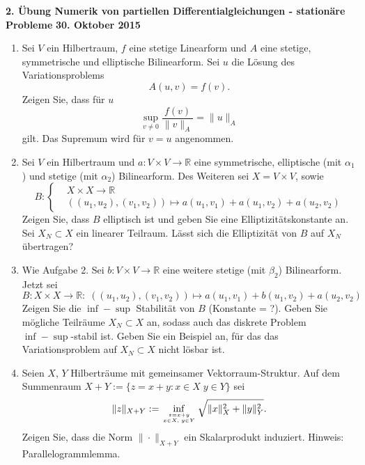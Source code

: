 \documentclass[11pt,a4paper]{report}
\begin{document}
\begin{center}
\textbf{2. \"Ubung Numerik von partiellen Differentialgleichungen - station\"are Probleme} \newline 
\textbf{30. Oktober 2015}
\end{center}
\begin{enumerate}








\item Sei $V$ ein Hilbertraum, $f$ eine stetige Linearform und $A$ eine stetige, symmetrische und elliptische Bilinearform. Sei $u$ die L\"osung des Variationsproblems
$$A(u,v) = f(v).$$
Zeigen Sie, dass f\"ur $u$
$$\sup\limits_{v\neq 0} \frac{f(v)}{\|v\|_A} = \|u\|_A$$
gilt. Das Supremum wird f\"ur $v=u$ angenommen.
\vspace{15pt}


\item Sei $V$ ein Hilbertraum und $a: V \times V \rightarrow \mathbb{R}$ eine symmetrische, elliptische (mit $\alpha_1$) und stetige (mit $\alpha_2$) Bilinearform. Des Weiteren sei $X = V \times V$, sowie
$$
B: \left\{
\begin{aligned}
 & X \times X \rightarrow \mathbb{R} \\
 &((u_1,u_2),(v_1,v_2)) \mapsto a(u_1,v_1) + a(u_1,v_2) + a(u_2,v_2)
\end{aligned}
\right.
$$
Zeigen Sie, dass $B$ elliptisch ist und geben Sie eine Elliptizit\"atskonstante an.
Sei $X_N \subset X$ ein linearer Teilraum. L\"asst sich die Elliptizit\"at von $B$ auf $X_N$ \"ubertragen?
\vspace{15pt}


\item Wie Aufgabe 2. Sei $b: V \times V \rightarrow \mathbb{R}$ eine weitere stetige (mit $\beta_2$) Bilinearform. Jetzt sei
$$
B: X \times X \rightarrow \mathbb{R}:\;((u_1,u_2),(v_1,v_2)) \mapsto a(u_1,v_1) + b(u_1,v_2) + a(u_2,v_2)
$$
Zeigen Sie die $\inf-\sup$ Stabilit\"at von $B$ (Konstante = ?).
Geben Sie m\"ogliche Teilr\"aume $X_N\subset X$ an, sodass auch das
diskrete Problem $\inf-\sup$-stabil ist. Geben Sie ein Beispiel an,
f\"ur das das Variationsproblem auf $X_N \subset X$ nicht l\"osbar ist.
\vspace{15pt}


\item Seien $X$, $Y$ Hilbertr\"aume mit gemeinsamer Vektorraum-Struktur. Auf dem Summenraum $X+Y:= \{z = x+ y: x\in X\;y\in Y \}$ sei 
$$\| z\|_{X+Y}:= \inf\limits_{z=x+y \atop x\in X,\; y\in Y} \sqrt{\|x\|_X^2 +\|y\|_Y^2}.$$
Zeigen Sie, dass die Norm $\|\cdot \|_{X+Y}$ ein Skalarprodukt
induziert. Hinweis: Parallelogrammlemma.
\vspace{15pt}




\end{enumerate}
\end{document}
